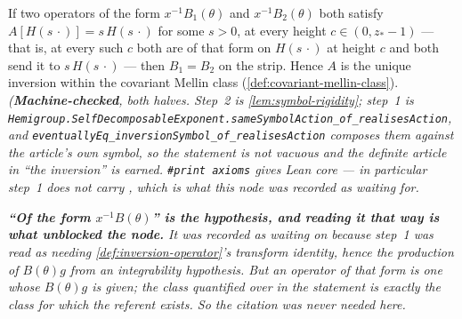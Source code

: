 \begin{lemma}\label{lem:symbol-uniqueness}
\leanok
If two operators of the form $x^{-1}B_1(\theta)$ and $x^{-1}B_2(\theta)$ both satisfy
$A[H(s\,\cdot)] = s\,H(s\,\cdot)$ for some $s > 0$, at every height $c \in (0, z_* - 1)$ --- that
is, at every such $c$ both are of that form on $H(s\,\cdot)$ at height $c$ and both send it to
$s\,H(s\,\cdot)$ --- then $B_1 = B_2$ on the strip. Hence $A$ is the unique inversion within the
covariant Mellin class (\ref{def:covariant-mellin-class}).
\statusT\quad\emph{(\textbf{Machine-checked}, both halves. Step~2 is
\ref{lem:symbol-rigidity}; step~1 is
\texttt{Hemigroup.SelfDecomposableExponent.sameSymbolAction\_of\_realisesAction}, and
\texttt{eventuallyEq\_inversionSymbol\_of\_realisesAction} composes them against the article's own
symbol, so the statement is not vacuous and the definite article in ``\emph{the} inversion'' is
earned. \texttt{\#print axioms} gives Lean core --- in particular step~1 does
\emph{not} carry , which is what this node was recorded as waiting for.}

\emph{\textbf{``Of the form $x^{-1}B(\theta)$'' is the hypothesis, and reading it that way is what
unblocked the node.} It was recorded as waiting on  because step~1 was read as needing
\ref{def:inversion-operator}'s transform identity, hence the \emph{production} of $B(\theta)g$ from
an integrability hypothesis. But an operator of that form is one whose $B(\theta)g$ is \emph{given};
the class quantified over in the statement is exactly the class for which the referent exists. So
the citation was never needed here.}


\end{lemma}
